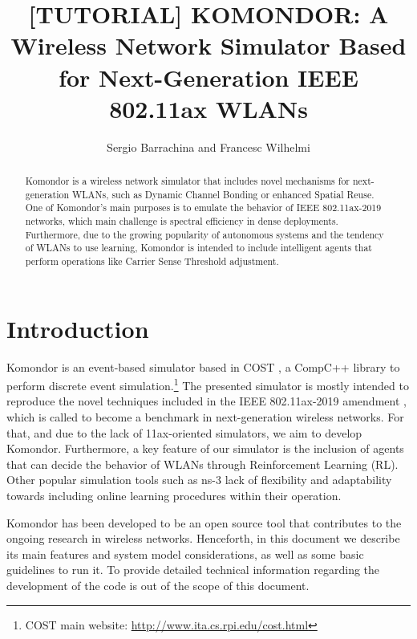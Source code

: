 \documentclass[a4paper]{article}
\title{[TUTORIAL] KOMONDOR: A Wireless Network Simulator Based for Next-Generation IEEE 802.11ax WLANs}
\author{Sergio Barrachina and Francesc Wilhelmi}
\begin{document}
\maketitle

\begin{abstract}
Komondor is a wireless network simulator that includes novel mechanisms for next-generation WLANs, such as Dynamic Channel Bonding or enhanced Spatial Reuse. One of Komondor's main purposes is to emulate the behavior of IEEE 802.11ax-2019 networks, which main challenge is spectral efficiency in dense deployments. Furthermore, due to the growing popularity of autonomous systems and the tendency of WLANs to use learning, Komondor is intended to include intelligent agents that perform operations like Carrier Sense Threshold adjustment.
\end{abstract}

\tableofcontents

\listoffigures

\listoftables

\section{Introduction}
\label{section:introduction}
	Komondor is an event-based simulator based in COST \cite{cost}, a CompC++ library to perform discrete event simulation.\footnote{COST main website: \url{http://www.ita.cs.rpi.edu/cost.html}} The presented simulator is mostly intended to reproduce the novel techniques included in the IEEE 802.11ax-2019 amendment \cite{tgax2017draft}, which is called to become a benchmark in next-generation wireless networks. For that, and due to the lack of 11ax-oriented simulators, we aim to develop Komondor. Furthermore, a key feature of our simulator is the inclusion of agents that can decide the behavior of WLANs through Reinforcement Learning (RL). Other popular simulation tools such as ns-3 lack of flexibility and adaptability towards including online learning procedures within their operation.
	
	Komondor has been developed to be an open source tool that contributes to the ongoing research in wireless networks. Henceforth, in this document we describe its main features and system model considerations, as well as some basic guidelines to run it. To provide detailed technical information regarding the development of the code is out of the scope of this document.
	
\end{document}
